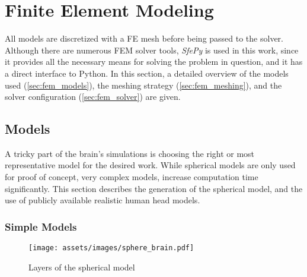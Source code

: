 \pagebreak
\chapter{Finite Element Modeling}

All models are discretized with a \gls{FE} mesh before being passed to the solver. Although there are numerous \gls{FEM} solver tools, \textit{SfePy} \cite{Cimrman2019} is used in this work, since it provides all the necessary means for solving the problem in question, and it has a direct interface to Python. In this section, a detailed overview of the models used (\autoref{sec:fem_models}), the meshing strategy (\autoref{sec:fem_meshing}), and the solver configuration (\autoref{sec:fem_solver}) are given.

\section{Models}
\label{sec:fem_models}

A tricky part of the brain's simulations is choosing the right or most representative model for the desired work. While spherical models are only used for proof of concept, very complex models, increase computation time significantly. This section describes the generation of the spherical model, and the use of publicly available realistic human head models.

\subsection{Simple Models}
\begin{wrapfigure}{r}{0.35\textwidth}
    \centering
    \texttt{[image: assets/images/sphere\_brain.pdf]}
    \caption{Layers of the spherical model}
    \vspace{-4cm}
    \label{fig:sphere_brain}
\end{wrapfigure}

